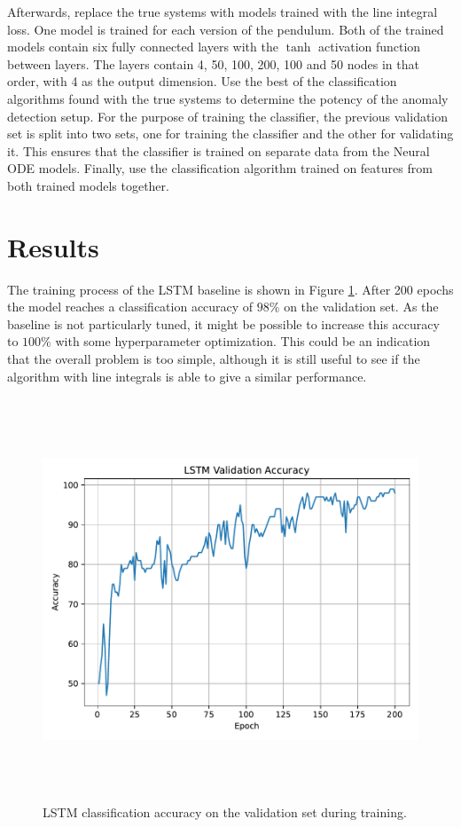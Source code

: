 \documentclass[12pt,a4paper]{book}
\begin{document}
Afterwards, replace the true systems with models trained with the line integral loss. One model is trained for each version of the pendulum. Both of the trained models contain six fully connected layers with the $\tanh$ activation function between layers. The layers contain 4, 50, 100, 200, 100 and 50 nodes in that order, with 4 as the output dimension. Use the best of the classification algorithms found with the true systems to determine the potency of the anomaly detection setup. For the purpose of training the classifier, the previous validation set is split into two sets, one for training the classifier and the other for validating it. This ensures that the classifier is trained on separate data from the Neural ODE models. Finally, use the classification algorithm trained on features from both trained models together.

\section{Results}

The training process of the LSTM baseline is shown in Figure \ref{fig:lstm_acc}. After 200 epochs the model reaches a classification accuracy of $98 \%$ on the validation set. As the baseline is not particularly tuned, it might be possible to increase this accuracy to $100 \%$ with some hyperparameter optimization. This could be an indication that the overall problem is too simple, although it is still useful to see if the algorithm with line integrals is able to give a similar performance.

\begin{figure}[H]
    \centering
    \includegraphics[height=12cm]{figs/plots/motion_classification/lstm_acc.pdf}
    \caption{LSTM classification accuracy on the validation set during training.}
    \label{fig:lstm_acc}
\end{figure}
\end{document}
